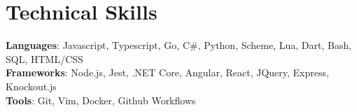 \documentclass[letterpaper,11pt]{article}
\begin{document}
%
\section{Technical Skills}
 \begin{itemize}[leftmargin=0.15in, label={}]
    \small{\item{
     \textbf{Languages}{: Javascript, Typescript, Go, C\#, Python, Scheme, Lua, Dart, Bash,  SQL, HTML/CSS} \\
     \textbf{Frameworks}{: Node.js, Jest, .NET Core, Angular, React, JQuery, Express, Knockout.js } \\
     \textbf{Tools}{: Git, Vim, Docker, Github Workflows} 
    }}
 \end{itemize}


\end{document}
